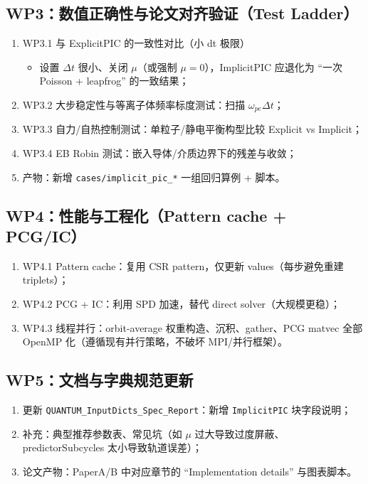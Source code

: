 \documentclass[UTF8,a4paper,12pt]{ctexart}
\newcommand{\code}[1]{\texttt{#1}}
\newcommand{\dt}{\Delta t}
\begin{document}
\subsection*{WP3：数值正确性与论文对齐验证（Test Ladder）}
\begin{enumerate}[leftmargin=2em]
  \item WP3.1 与 ExplicitPIC 的一致性对比（小 dt 极限）
  \begin{itemize}
    \item 设置 $\dt$ 很小、关闭 $\mu$（或强制 $\mu=0$），ImplicitPIC 应退化为 ``一次 Poisson + leapfrog'' 的一致结果；
  \end{itemize}
  \item WP3.2 大步稳定性与等离子体频率标度测试：扫描 $\omega_{pe}\dt$；
  \item WP3.3 自力/自热控制测试：单粒子/静电平衡构型比较 Explicit vs Implicit；
  \item WP3.4 EB Robin 测试：嵌入导体/介质边界下的残差与收敛；
  \item 产物：新增 \code{cases/implicit_pic_*} 一组回归算例 + 脚本。
\end{enumerate}

\subsection*{WP4：性能与工程化（Pattern cache + PCG/IC）}
\begin{enumerate}[leftmargin=2em]
  \item WP4.1 Pattern cache：复用 CSR pattern，仅更新 values（每步避免重建 triplets）；
  \item WP4.2 PCG + IC：利用 SPD 加速，替代 direct solver（大规模更稳）；
  \item WP4.3 线程并行：orbit-average 权重构造、沉积、gather、PCG matvec 全部 OpenMP 化（遵循现有并行策略，不破坏 MPI/并行框架）。
\end{enumerate}

\subsection*{WP5：文档与字典规范更新}
\begin{enumerate}[leftmargin=2em]
  \item 更新 \code{QUANTUM\_InputDicts\_Spec\_Report}：新增 \code{ImplicitPIC} 块字段说明；
  \item 补充：典型推荐参数表、常见坑（如 $\mu$ 过大导致过度屏蔽、predictorSubcycles 太小导致轨道误差）；
  \item 论文产物：PaperA/B 中对应章节的 ``Implementation details'' 与图表脚本。
\end{enumerate}
\end{document}
